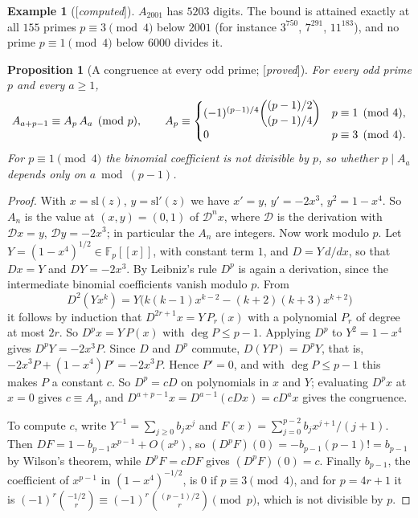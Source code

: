 \documentclass[11pt]{amsart}
\numberwithin{equation}{section}
\newtheorem{proposition}[theorem]{Proposition}
\theoremstyle{definition}
\newtheorem{example}[theorem]{Example}
\theoremstyle{remark}
\renewcommand{\sl}{\mathrm{sl}}
\newcommand{\status}[1]{\textup{[\emph{#1}]}}
\begin{document}
\begin{example}[\status{computed}]
$A_{2001}$ has $5203$ digits. The bound is attained exactly at all $155$ primes $p\equiv3\pmod4$ below $2001$ (for instance $3^{750}$, $7^{291}$, $11^{183}$), and no prime $p\equiv1\pmod4$ below $6000$ divides it.
\end{example}

\begin{proposition}[A congruence at every odd prime; \status{proved}]\label{prop:lemncong}
For every odd prime $p$ and every $a\ge1$,
\begin{equation}\label{eq:lemncong}
 A_{a+p-1}\equiv A_p\,A_a\pmod p,\qquad
 A_p\equiv\begin{cases}(-1)^{(p-1)/4}\dbinom{(p-1)/2}{(p-1)/4}&p\equiv1\pmod4,\\[4pt] 0&p\equiv3\pmod4.\end{cases}
\end{equation}
For $p\equiv1\pmod4$ the binomial coefficient is not divisible by $p$, so whether $p\mid A_a$ depends only on $a\bmod(p-1)$.
\end{proposition}
\begin{proof}
With $x=\sl(z)$, $y=\sl'(z)$ we have $x'=y$, $y'=-2x^3$, $y^2=1-x^4$. So $A_n$ is the value at $(x,y)=(0,1)$ of $\mathcal D^nx$, where $\mathcal D$ is the derivation with $\mathcal Dx=y$, $\mathcal Dy=-2x^3$; in particular the $A_n$ are integers. Now work modulo $p$. Let $Y=(1-x^4)^{1/2}\in\mathbb F_p[[x]]$, with constant term $1$, and $D=Y\,d/dx$, so that $Dx=Y$ and $DY=-2x^3$. By Leibniz's rule $D^p$ is again a derivation, since the intermediate binomial coefficients vanish modulo $p$. From
\begin{equation}
 D^2(Yx^k)=Y\bigl(k(k-1)x^{k-2}-(k+2)(k+3)x^{k+2}\bigr)
\end{equation}
it follows by induction that $D^{2r+1}x=Y\,P_r(x)$ with a polynomial $P_r$ of degree at most $2r$. So $D^px=Y\,P(x)$ with $\deg P\le p-1$. Applying $D^p$ to $Y^2=1-x^4$ gives $D^pY=-2x^3P$. Since $D$ and $D^p$ commute, $D(YP)=D^pY$, that is, $-2x^3P+(1-x^4)P'=-2x^3P$. Hence $P'=0$, and with $\deg P\le p-1$ this makes $P$ a constant $c$. So $D^p=cD$ on polynomials in $x$ and $Y$; evaluating $D^px$ at $x=0$ gives $c\equiv A_p$, and $D^{a+p-1}x=D^{a-1}(cDx)=cD^ax$ gives the congruence.

To compute $c$, write $Y^{-1}=\sum_{j\ge0}b_jx^j$ and $F(x)=\sum_{j=0}^{p-2}b_jx^{j+1}/(j+1)$. Then $DF=1-b_{p-1}x^{p-1}+O(x^p)$, so $(D^pF)(0)=-b_{p-1}(p-1)!=b_{p-1}$ by Wilson's theorem, while $D^pF=cDF$ gives $(D^pF)(0)=c$. Finally $b_{p-1}$, the coefficient of $x^{p-1}$ in $(1-x^4)^{-1/2}$, is $0$ if $p\equiv3\pmod4$, and for $p=4r+1$ it is $(-1)^r\binom{-1/2}{r}\equiv(-1)^r\binom{(p-1)/2}{r}\pmod p$, which is not divisible by $p$.
\end{proof}
\end{document}
